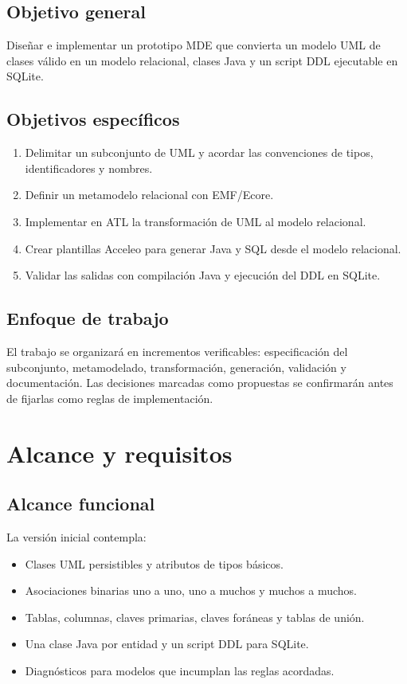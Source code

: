 \documentclass[12pt,a4paper,oneside]{report}
\begin{document}
\section{Objetivo general}
Diseñar e implementar un prototipo MDE que convierta un modelo UML de clases válido en un modelo relacional, clases Java y un script DDL ejecutable en SQLite.

\section{Objetivos específicos}
\begin{enumerate}
  \item Delimitar un subconjunto de UML y acordar las convenciones de tipos, identificadores y nombres.
  \item Definir un metamodelo relacional con EMF/Ecore.
  \item Implementar en ATL la transformación de UML al modelo relacional.
  \item Crear plantillas Acceleo para generar Java y SQL desde el modelo relacional.
  \item Validar las salidas con compilación Java y ejecución del DDL en SQLite.
\end{enumerate}

\section{Enfoque de trabajo}
El trabajo se organizará en incrementos verificables: especificación del subconjunto, metamodelado, transformación, generación, validación y documentación. Las decisiones marcadas como propuestas se confirmarán antes de fijarlas como reglas de implementación.

\chapter{Alcance y requisitos}
\section{Alcance funcional}
La versión inicial contempla:
\begin{itemize}
  \item Clases UML persistibles y atributos de tipos básicos.
  \item Asociaciones binarias uno a uno, uno a muchos y muchos a muchos.
  \item Tablas, columnas, claves primarias, claves foráneas y tablas de unión.
  \item Una clase Java por entidad y un script DDL para SQLite.
  \item Diagnósticos para modelos que incumplan las reglas acordadas.
\end{itemize}
\end{document}

